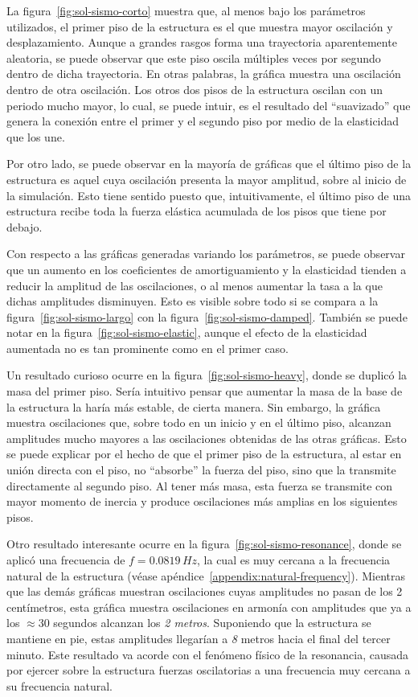 La figura~\ref{fig:sol-sismo-corto} muestra que, al menos bajo los parámetros utilizados, el primer piso de la estructura es el que muestra mayor oscilación y desplazamiento. Aunque a grandes rasgos forma una trayectoria aparentemente aleatoria, se puede observar que este piso oscila múltiples veces por segundo dentro de dicha trayectoria. En otras palabras, la gráfica muestra una oscilación dentro de otra oscilación. Los otros dos pisos de la estructura oscilan con un periodo mucho mayor, lo cual, se puede intuir, es el resultado del ``suavizado'' que genera la conexión entre el primer y el segundo piso por medio de la elasticidad que los une.

Por otro lado, se puede observar en la mayoría de gráficas que el último piso de la estructura es aquel cuya oscilación presenta la mayor amplitud, sobre al inicio de la simulación. Esto tiene sentido puesto que, intuitivamente, el último piso de una estructura recibe toda la fuerza elástica acumulada de los pisos que tiene por debajo.

Con respecto a las gráficas generadas variando los parámetros, se puede observar que un aumento en los coeficientes de amortiguamiento y la elasticidad tienden a reducir la amplitud de las oscilaciones, o al menos aumentar la tasa a la que dichas amplitudes disminuyen. Esto es visible sobre todo si se compara a la figura~\ref{fig:sol-sismo-largo} con la figura~\ref{fig:sol-sismo-damped}. También se puede notar en la figura~\ref{fig:sol-sismo-elastic}, aunque el efecto de la elasticidad aumentada no es tan prominente como en el primer caso.

Un resultado curioso ocurre en la figura~\ref{fig:sol-sismo-heavy}, donde se duplicó la masa del primer piso. Sería intuitivo pensar que aumentar la masa de la base de la estructura la haría más estable, de cierta manera. Sin embargo, la gráfica muestra oscilaciones que, sobre todo en un inicio y en el último piso, alcanzan amplitudes mucho mayores a las oscilaciones obtenidas de las otras gráficas. Esto se puede explicar por el hecho de que el primer piso de la estructura, al estar en unión directa con el piso, no ``absorbe'' la fuerza del piso, sino que la transmite directamente al segundo piso. Al tener más masa, esta fuerza se transmite con mayor momento de inercia y produce oscilaciones más amplias en los siguientes pisos.

Otro resultado interesante ocurre en la figura~\ref{fig:sol-sismo-resonance}, donde se aplicó una frecuencia de \(f = 0.0819 \, \si{Hz}\), la cual es muy cercana a la frecuencia natural de la estructura (véase apéndice~\ref{appendix:natural-frequency}). Mientras que las demás gráficas muestran oscilaciones cuyas amplitudes no pasan de los 2 centímetros, esta gráfica muestra oscilaciones en armonía con amplitudes que ya a los \(\approx 30\) segundos alcanzan los \textit{2 metros}. Suponiendo que la estructura se mantiene en pie, estas amplitudes llegarían a \textit{8} metros hacia el final del tercer minuto. Este resultado va acorde con el fenómeno físico de la resonancia, causada por ejercer sobre la estructura fuerzas oscilatorias a una frecuencia muy cercana a su frecuencia natural.


